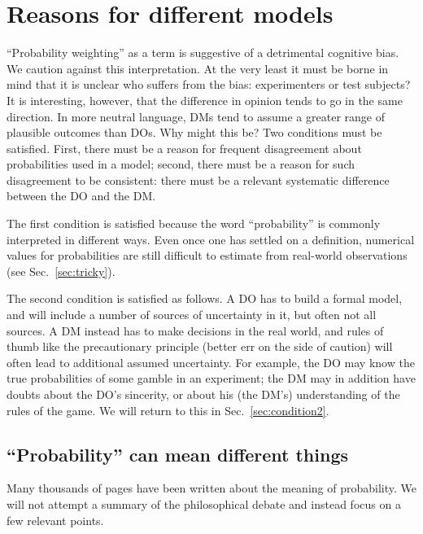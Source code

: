\documentclass[a4paper, 12pt]{article}
\newcommand{\seclabel}[1]{\label{sec:#1}}
\newcommand{\secref}[1]{Sec.~\ref{sec:#1}}
\newcommand{\eg}{{\it e.g.}\ }
\begin{document}
\FloatBarrier
\section{Reasons for different models\seclabel{Reasons_for}}
``Probability weighting'' as a term is suggestive of a detrimental cognitive bias. We caution against this interpretation. At the very least it must be borne in mind that it is unclear who suffers from the bias: experimenters or test subjects? It is interesting, however, that the difference in opinion tends to go in the same direction. In more neutral language, DMs tend to assume a greater range of plausible outcomes than DOs. Why might this be? Two conditions must be satisfied. First, there must be a reason for frequent disagreement about probabilities used in a model; second, there must be a reason for such disagreement to be consistent: there must be a relevant systematic difference between the DO and the DM. 

The first condition is satisfied because the word ``probability'' is commonly interpreted in different ways. Even once one has settled on a definition, numerical values for probabilities are still difficult to estimate from real-world observations (see \secref{tricky}).

The second condition is satisfied as follows. A DO has to build a formal model, and will include a number of sources of uncertainty in it, but often not all sources. A DM instead has to make decisions in the real world, and rules of thumb like the precautionary principle (better err on the side of caution) will often lead to additional assumed uncertainty. For example, the DO may know the true probabilities of some gamble in an experiment; the DM may in addition have doubts about the DO's sincerity, or about his (the DM's) understanding of the rules of the game. We will return to this in \secref{condition2}.

\subsection{``Probability'' can mean different things \seclabel{tricky}}

Many thousands of pages have been written about the meaning of probability. We will not attempt a summary of the philosophical debate and instead focus on a few relevant points.
\end{document}
